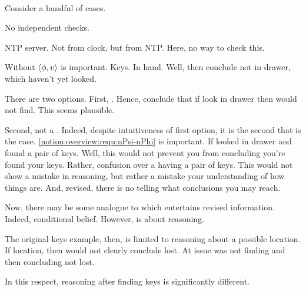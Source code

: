 \paragraph*{}

\begin{note}
  Consider a handful of cases.
\end{note}

\begin{note}[Trivial]
  No independent checks.
\end{note}

\begin{note}[Pruning]
  NTP server.
  Not from clock, but from NTP.
  Here, no way to check this.
\end{note}


\begin{note}
  Without \(\langle \phi, v \rangle\) is important.
  Keys.
  In hand.
  Well, then conclude not in drawer, which haven't yet looked.

  There are two options.
  First, \requ{}.
  Hence, conclude that if look in drawer then would not find.
  This seems plausible.

  Second, not a \requ{}.
  Indeed, despite intuitiveness of first option, it is the second that is the case.
  \autoref{notion:overview:requ:nPsi-nPhi} is important.
  If looked in drawer and found a pair of keys.
  Well, this would not prevent you from concluding you're found your keys.
  Rather, confusion over a having a pair of keys.
  This would not show a mistake in reasoning, but rather a mistake your understanding of how things are.
  And, revised, there is no telling what conclusions you may reach.

  Now, there may be some analogue to \csN{} which entertains revised information.
  Indeed, conditional belief.
  However, \csN{} is about reasoning.

  The original keys example, then, is limited to reasoning about a possible location.
  If location, then would not clearly conclude lost.
  At issue was not finding and then concluding not lost.

  In this respect, reasoning after finding keys is significantly different.
\end{note}

